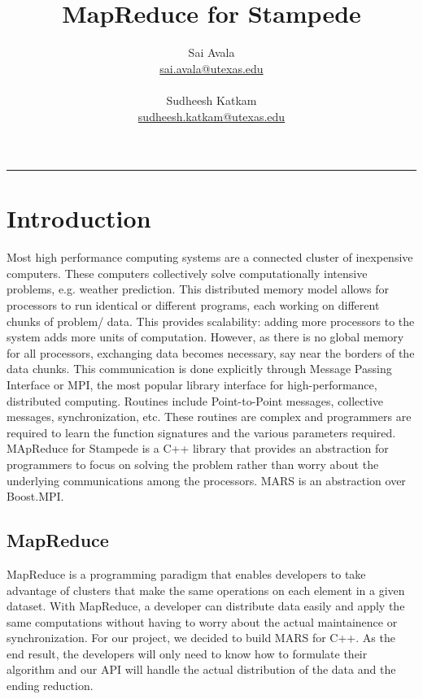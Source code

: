 \documentclass[11pt]{article}
\title{MapReduce for Stampede}
\author{
  Sai Avala\\ 
  \href{mailto:sai.avala@utexas.edu}
          {sai.avala@utexas.edu}  \\ \\
  Sudheesh Katkam \\
  \href{mailto:sudheesh.katkam@utexas.edu}
          {sudheesh.katkam@utexas.edu}  }
\begin{document}
\maketitle
\newpage
\rule{6.0in}{.001in}
\tableofcontents
\newpage

\section{Introduction}
Most high performance computing systems are a connected cluster of inexpensive computers. These computers collectively solve computationally intensive problems, e.g. weather prediction. This distributed memory model allows for processors to run identical or different programs, each working on different chunks of problem/ data. This provides scalability: adding more processors to the system adds more units of computation. However, as there is no global memory for all processors, exchanging data becomes necessary, say near the borders of the data chunks. This communication is done explicitly through Message Passing Interface or MPI, the most popular library interface for high-performance, distributed computing. Routines include Point-to-Point messages, collective messages, synchronization, etc. These routines are complex and programmers are required to learn the function signatures and the various parameters required. MApReduce for Stampede is a C++ library that provides an abstraction for programmers to focus on solving the problem rather than worry about the underlying communications among the processors. MARS is an abstraction over Boost.MPI.

\subsection{MapReduce}
MapReduce is a programming paradigm that enables developers to take advantage of clusters that make the same operations on each element in a given dataset. With MapReduce, a developer can distribute data easily and apply the same computations without having to worry about the actual maintainence or synchronization. For our project, we decided to build MARS for C++. As the end result, the developers will only need to know how to formulate their algorithm and our API will handle the actual distribution of the data and the ending reduction.
\end{document}
